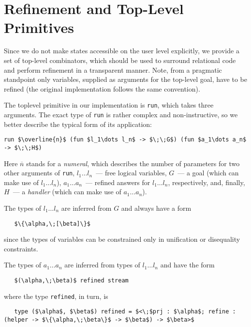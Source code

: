 \section{Refinement and Top-Level Primitives}
\label{refinement}

Since we do not make states accessible on the user level explicitly, we provide
a set of top-level combinators, which should be used to surround relational code
and perform refinement in a transparent manner. Note, from a pragmatic
standpoint only variables, supplied as arguments for the top-level goal, have
to be refined (the original \miniKanren implementation follows the same convention).

The toplevel primitive in our implementation is \lstinline{run}, which takes three
arguments. The exact type of \lstinline{run} is rather complex and non-instructive, 
so we better describe the typical form of its application:

\begin{lstlisting}[mathescape=true]
   run $\overline{n}$ (fun $l_1\dots l_n$ -> $\;\;G$) (fun $a_1\dots a_n$ -> $\;\;H$)
\end{lstlisting}

Here $\overline{n}$ stands for a \emph{numeral}, which describes the number of
parameters for two other arguments of \lstinline{run}, \mbox{$l_1\dots l_n$}~---
free logical variables, $G$~--- a goal (which can make use of \mbox{$l_1\dots l_n$}), 
\mbox{$a_1\dots a_n$}~--- refined answers for \mbox{$l_1\dots l_n$}, respectively, and, 
finally, $H$~--- a \emph{handler} (which can make use of \mbox{$a_1\dots a_n$}). 

The types of \mbox{$l_1\dots l_n$} are inferred from $G$ and always have a form

\begin{lstlisting}
   $\{\alpha,\;[\beta]\}$
\end{lstlisting}

since the types of variables can be constrained only in unification or disequality constraints.

The types of \mbox{$a_1\dots a_n$} are inferred from types of \mbox{$l_1\dots l_n$} and
have the form

\begin{lstlisting}
   $(\alpha,\;\beta)$ refined stream
\end{lstlisting}

where the type \lstinline{refined}, in turn, is

\begin{lstlisting}
   type ($\alpha$, $\beta$) refined = $<\;$prj : $\alpha$; refine : (helper -> $\{\alpha,\;\beta\}$ -> $\beta$) -> $\beta>$
\end{lstlisting}

